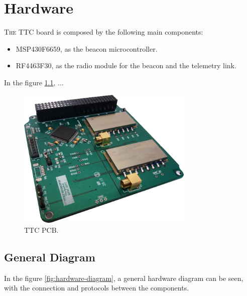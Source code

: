 \documentclass[12pt]{book}
\begin{document}

\chapter{Hardware}

\lettrine{T}{he} TTC board is composed by the following main components:

\begin{itemize}
	\item MSP430F6659, as the beacon microcontroller.
	\item RF4463F30, as the radio module for the beacon and the telemetry link.
\end{itemize}

In the figure \ref{fig:ttc-board}, ...

\begin{figure}[!h]
	\begin{center}
		\includegraphics[width=0.75\textwidth]{figures/ttc_board.png}
		\caption{TTC PCB.}
		\label{fig:ttc-board}
	\end{center}
\end{figure}

\section{General Diagram}

In the figure \ref{fig:hardware-diagram}, a general hardware diagram can be seen, with the connection and protocols between the components.
\end{document}
